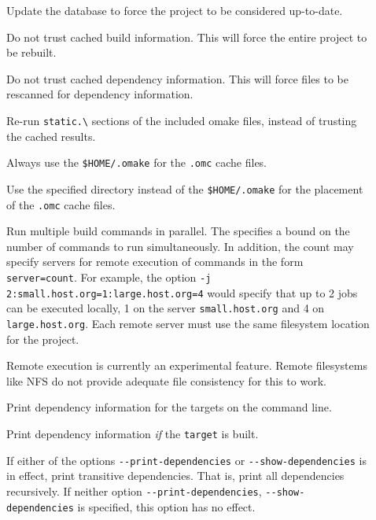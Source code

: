 \begin{description}
\item[] Update the  database to force the project to be considered up-to-date.

\item[] Do not trust cached build information.  This will force the entire project to be rebuilt.

\item[] Do not trust cached dependency information.  This will force files to be rescanned
for dependency information.

\item[] Re-run \verb+static.\+ sections of the included omake files, instead of
trusting the cached results.

\item[] Always use the \verb+$HOME/.omake+ for the \verb+.omc+ cache files.

\item[] Use the specified directory instead of the \verb+$HOME/.omake+
for the placement of the \verb+.omc+ cache files.

\item[] Run multiple build commands in parallel.  The  specifies a
bound on the number of commands to run simultaneously.  In addition, the count may specify servers
for remote execution of commands in the form \verb+server=count+.  For example, the option
\verb+-j 2:small.host.org=1:large.host.org=4+ would specify that up to 2 jobs can be executed
locally, 1 on the server \verb+small.host.org+ and 4 on \verb+large.host.org+.  Each remote server
must use the same filesystem location for the project.

Remote execution is currently an experimental feature.  Remote filesystems like NFS do not provide
adequate file consistency for this to work.

\item[] Print dependency information for the targets on the command line.

\item[] Print dependency information \emph{if} the \verb+target+ is built.

\item[] If either of the options \texttt{-{}-print-dependencies} or
\texttt{-{}-show-dependencies} is in effect, print transitive dependencies.  That is, print all
dependencies recursively.  If neither option \texttt{-{}-print-dependencies},
\texttt{-{}-show-dependencies} is specified, this option has no effect.


\end{description}
